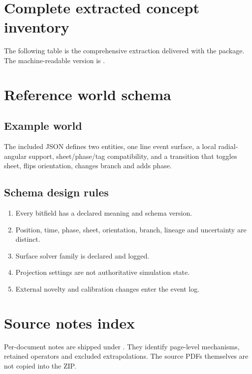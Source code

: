 \documentclass[10.5pt,a4paper,openany]{book}
\begin{document}
\appendix
\chapter{Complete extracted concept inventory}
The following table is the comprehensive extraction delivered with the package. The machine-readable version is .


\chapter{Reference world schema}
\section{Example world}
The included JSON defines two entities, one line event surface, a local radial-angular support, sheet/phase/tag compatibility, and a transition that toggles sheet, flips orientation, changes branch and adds phase.


\section{Schema design rules}
\begin{enumerate}
\item Every bitfield has a declared meaning and schema version.
\item Position, time, phase, sheet, orientation, branch, lineage and uncertainty are distinct.
\item Surface solver family is declared and logged.
\item Projection settings are not authoritative simulation state.
\item External novelty and calibration changes enter the event log.
\end{enumerate}

\chapter{Source notes index}
Per-document notes are shipped under . They identify page-level mechanisms, retained operators and excluded extrapolations. The source PDFs themselves are not copied into the ZIP.
\end{document}
